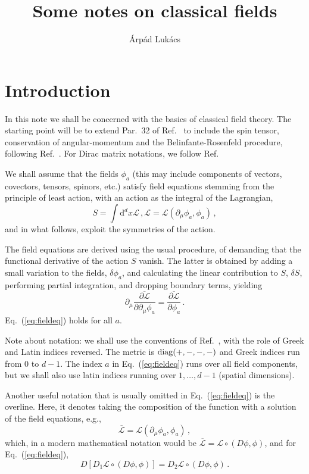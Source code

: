 \documentclass[a4paper,12pt]{article}
\title{Some notes on classical fields}
\author{Árpád Lukács}
\def\d{\mathrm{d}}
\def\lag{{\mathcal{L}}}
\begin{document}
\maketitle

\section{Introduction}\label{sec:intro}
In this note we shall be concerned with the basics of classical field theory. The starting point will be to extend Par.\ 32 of Ref.\ \cite{LL2} to include the spin tensor, conservation of angular-momentum and the Belinfante-Rosenfeld procedure, following Ref.\ \cite{wentzel}. For Dirac matrix notations, we follow Ref.\ \cite{BD, itzykson}

We shall assume that the fields $\phi_a$ (this may include components of vectors, covectors, tensors, spinors, etc.) satisfy field equations stemming from the principle of least action, with an action as the integral of the Lagrangian,
\begin{equation}\label{eq:action}
 S = \int \d^d x \lag\,, \lag=\lag(\partial_\mu \phi_a, \phi_a)\,,
\end{equation}
and in what follows, exploit the symmetries of the action.

The field equations are derived using the usual procedure, of demanding that the functional derivative of the action $S$ vanish. The latter is obtained by adding a small variation to the fields, $\delta\phi_a$, and calculating the linear contribution to $S$, $\delta S$, performing partial integration, and dropping boundary terms, yielding
\begin{equation}\label{eq:fieldeq}
 \partial_\mu \overline{\frac{\partial \lag}{\partial \partial_\mu \phi_a}} = \overline{\frac{\partial\lag}{\partial \phi_a}}\,.
\end{equation}
Eq.\ (\ref{eq:fieldeq}) holds for all $a$.

Note about notation: we shall use the conventions of Ref.\ \cite{LL2}, with the role of Greek and Latin indices reversed. The metric is $\mathop{\rm diag}(+,-,-,-)$ and Greek indices run from 0 to $d-1$. The index $a$ in Eq.\ (\ref{eq:fieldeq}) runs over all field components, but we shall also use latin indices running over $1,\dots, d-1$ (spatial dimensions).

Another useful notation that is usually omitted in Eq.\ (\ref{eq:fieldeq}) is the overline. Here, it denotes taking the composition of the function with a solution of the field equations, e.g.,
\begin{equation}
 \overline\lag = \lag(\partial_\mu \phi_a, \phi_a)\,,
\end{equation}
which, in a modern mathematical notation would be $\overline{\lag} = \lag \circ(D\phi,\phi)$, and for Eq.\ (\ref{eq:fieldeq}),
\begin{equation}\label{eq:fieldeqBourbaki}
 D [ D_1 \lag \circ (D\phi, \phi)] = D_2 \lag \circ (D\phi, \phi)\,.
\end{equation}
\end{document}
